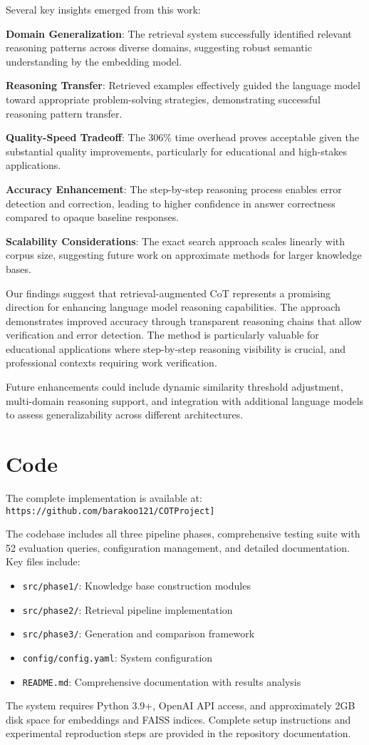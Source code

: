 \documentclass{article}
\begin{document}
Several key insights emerged from this work:

\textbf{Domain Generalization}: The retrieval system successfully identified relevant reasoning patterns across diverse domains, suggesting robust semantic understanding by the embedding model.

\textbf{Reasoning Transfer}: Retrieved examples effectively guided the language model toward appropriate problem-solving strategies, demonstrating successful reasoning pattern transfer.

\textbf{Quality-Speed Tradeoff}: The 306\% time overhead proves acceptable given the substantial quality improvements, particularly for educational and high-stakes applications.

\textbf{Accuracy Enhancement}: The step-by-step reasoning process enables error detection and correction, leading to higher confidence in answer correctness compared to opaque baseline responses.

\textbf{Scalability Considerations}: The exact search approach scales linearly with corpus size, suggesting future work on approximate methods for larger knowledge bases.

Our findings suggest that retrieval-augmented CoT represents a promising direction for enhancing language model reasoning capabilities. The approach demonstrates improved accuracy through transparent reasoning chains that allow verification and error detection. The method is particularly valuable for educational applications where step-by-step reasoning visibility is crucial, and professional contexts requiring work verification.

Future enhancements could include dynamic similarity threshold adjustment, multi-domain reasoning support, and integration with additional language models to assess generalizability across different architectures.

\section{Code}

The complete implementation is available at: \texttt{https://github.com/barakoo121/COTProject]}

The codebase includes all three pipeline phases, comprehensive testing suite with 52 evaluation queries, configuration management, and detailed documentation. Key files include:

\begin{itemize}
\item \texttt{src/phase1/}: Knowledge base construction modules
\item \texttt{src/phase2/}: Retrieval pipeline implementation
\item \texttt{src/phase3/}: Generation and comparison framework
\item \texttt{config/config.yaml}: System configuration
\item \texttt{README.md}: Comprehensive documentation with results analysis
\end{itemize}

The system requires Python 3.9+, OpenAI API access, and approximately 2GB disk space for embeddings and FAISS indices. Complete setup instructions and experimental reproduction steps are provided in the repository documentation.



\end{document}
